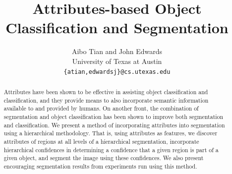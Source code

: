\documentclass[10pt,twocolumn,letterpaper]{article}
\begin{document}
\title{Attributes-based Object Classification and Segmentation}

\author{Aibo Tian and John Edwards\\
University of Texas at Austin\\
{\tt\small \{atian,edwardsj\}@cs.utexas.edu}
}

\maketitle
\thispagestyle{empty}

\begin{abstract}
Attributes have been shown to be effective in assisting object classification and
classification, and they provide means to also incorporate semantic
information available to and provided by humans.  On another front, the
combination of segmentation and object classification has been shown to
improve both segmentation and classification.  We present a method of incorporating
attributes into segmentation using a hierarchical methodology.
That is, using attributes as features, we discover attributes of regions
at all levels of a hierarchical segmentation,
incorporate hierarchical confidences in determining a confidence that
a given region is part of a given object, and segment the image using
these confidences.  We also present encouraging segmentation results
from experiments run using this method.
\end{abstract}

\end{document}
